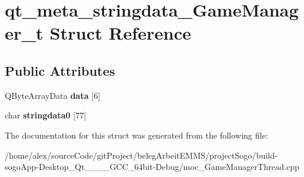 \hypertarget{structqt__meta__stringdata__GameManager__t}{\section{qt\-\_\-meta\-\_\-stringdata\-\_\-\-Game\-Manager\-\_\-t Struct Reference}
\label{structqt__meta__stringdata__GameManager__t}
}
\subsection*{Public Attributes}
\begin{DoxyCompactItemize}
\item 
\hypertarget{structqt__meta__stringdata__GameManager__t_a47ebefbdef9ba1cc2cf0c775079e98d2}{Q\-Byte\-Array\-Data {\bfseries data} \mbox{[}6\mbox{]}}\label{structqt__meta__stringdata__GameManager__t_a47ebefbdef9ba1cc2cf0c775079e98d2}

\item 
\hypertarget{structqt__meta__stringdata__GameManager__t_ab5782b7e88f397fe982ec34b7b6464da}{char {\bfseries stringdata0} \mbox{[}77\mbox{]}}\label{structqt__meta__stringdata__GameManager__t_ab5782b7e88f397fe982ec34b7b6464da}

\end{DoxyCompactItemize}


The documentation for this struct was generated from the following file\-:\begin{DoxyCompactItemize}
\item 
/home/alex/source\-Code/git\-Project/beleg\-Arbeit\-E\-M\-M\-S/project\-Sogo/build-\/sogo\-App-\/\-Desktop\-\_\-\-Qt\-\_\-\_\-\_\-\_\-\-G\-C\-C\-\_\-64bit-\/\-Debug/moc\-\_\-\-Game\-Manager\-Thread.\-cpp\end{DoxyCompactItemize}
